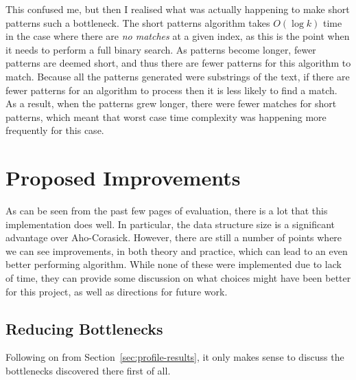 \documentclass[ %
                    author={Dominic Joseph Moylett},
                    degree={MEng},
                     title={Dictionary Matching with Fingerprints},
                  subtitle={An Empirical Analysis},
                      type={research},
                      year={2015} ]{dissertation}
\begin{document}
This confused me, but then I realised what was actually happening to make short patterns such a bottleneck. The short patterns algorithm takes $O(\log k)$ time in the case where there are \textit{no matches} at a given index, as this is the point when it needs to perform a full binary search. As patterns become longer, fewer patterns are deemed short, and thus there are fewer patterns for this algorithm to match. Because all the patterns generated were substrings of the text, if there are fewer patterns for an algorithm to process then it is less likely to find a match. As a result, when the patterns grew longer, there were fewer matches for short patterns, which meant that worst case time complexity was happening more frequently for this case.

\section{Proposed Improvements}

As can be seen from the past few pages of evaluation, there is a lot that this implementation does well. In particular, the data structure size is a significant advantage over Aho-Corasick. However, there are still a number of points where we can see improvements, in both theory and practice, which can lead to an even better performing algorithm. While none of these were implemented due to lack of time, they can provide some discussion on what choices might have been better for this project, as well as directions for future work.

\subsection{Reducing Bottlenecks}
\label{sec:reduce-bottle}

Following on from Section~\ref{sec:profile-results}, it only makes sense to discuss the bottlenecks discovered there first of all.
\end{document}
